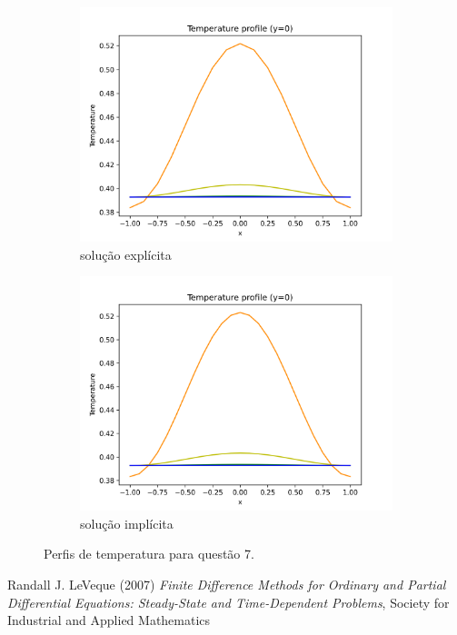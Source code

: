 \documentclass{article}
\begin{document}
\begin{figure}[h]
\centering
     \begin{subfigure}[b]{0.49\textwidth}
         \centering
         \includegraphics[width=\textwidth]{figs/q7a_temperature_profile.png}
         \caption{solução explícita}
	\label{fig:q7a_temperature_profile}
     \end{subfigure}
     \hfill
     \begin{subfigure}[b]{0.49\textwidth}
         \centering
     \includegraphics[width=\textwidth]{figs/q7b_temperature_profile.png}
         \caption{solução implícita}
	\label{fig:q7b_temperature_profile}
     \end{subfigure}
	\caption{Perfis de temperatura para questão 7.}
\end{figure}



\begin{thebibliography}{9}
Randall J. LeVeque (2007) \emph{Finite Difference Methods for Ordinary and Partial Differential Equations:
Steady-State and Time-Dependent Problems}, Society for Industrial and Applied Mathematics 
\end{thebibliography}
\end{document}
